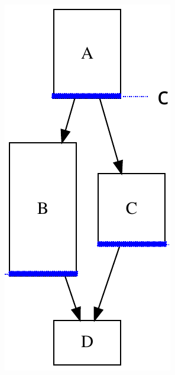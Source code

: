 \documentclass[12pt,dvipdfmx]{beamer}
\begin{document}
\begin{frame}[fragile]
\begin{columns}[t]
\begin{column}{0.30\textwidth}
\begin{center}
\includegraphics[width=\textwidth]{out/pdf/svg/dag.pdf}
\end{center}
\end{column}
\end{columns}
\end{frame}
\end{document}
